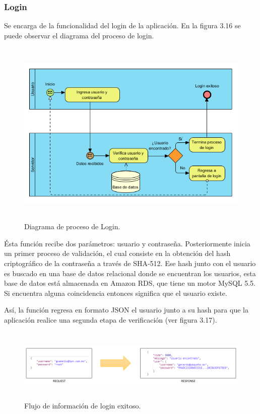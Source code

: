 \subsubsection{Login}
Se encarga de la funcionalidad del login de la aplicación. En la figura 3.16 se puede observar el diagrama del proceso de login.\par
\begin{figure}[h!]
	\centering
	\includegraphics[width=15cm,height=9cm]{imagenes/desarrollo/diagramas/BPMN_LOGIN.png}
	\caption{Diagrama de proceso de Login.}
	\label{fig:loginsuccess}
\end{figure}
Ésta función recibe dos parámetros: usuario y contraseña. Posteriormente inicia un primer proceso de validación, el cual consiste en la obtención del hash criptográfico de la contraseña a través de SHA-512. Ese hash junto con el usuario es buscado en una base de datos relacional donde se encuentran los usuarios, esta base de datos está almacenada en Amazon RDS, que tiene un motor MySQL 5.5. Si encuentra alguna coincidencia entonces significa que el usuario existe.\par Así, la función regresa en formato JSON el usuario junto a su hash para que la aplicación realice una segunda etapa de verificación (ver figura 3.17). \par
\begin{figure}[h!]
	\centering
	\includegraphics[width=15cm,height=3.5cm]{imagenes/desarrollo/arquitectura/LOGIN_SUCCESS.png}
	\caption{Flujo de información de login exitoso.}
	\label{fig:loginsuccess}
\end{figure}

